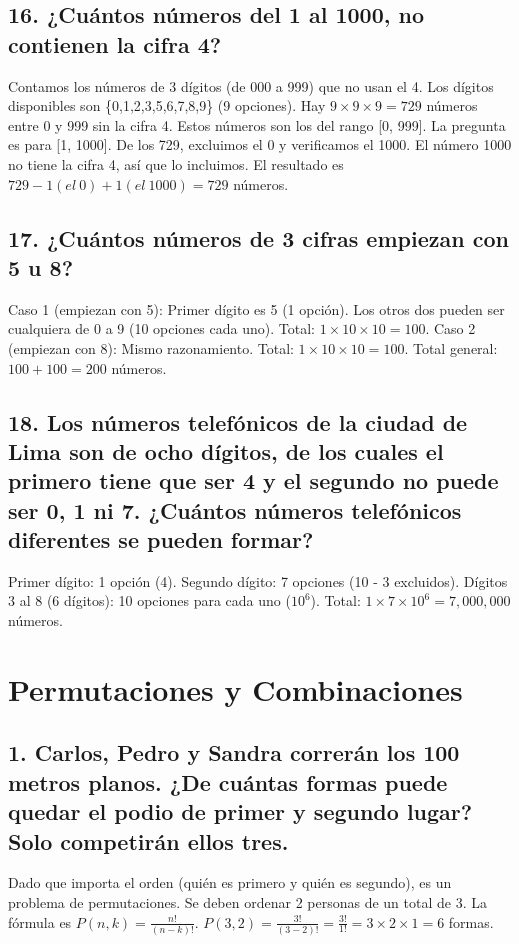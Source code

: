 \documentclass[11pt]{article}
\begin{document}
    \subsection*{16. ¿Cuántos números del 1 al 1000, no contienen la cifra 4?}
    Contamos los números de 3 dígitos (de 000 a 999) que no usan el 4. Los dígitos disponibles son \{0,1,2,3,5,6,7,8,9\} (9 opciones).
    Hay $9 \times 9 \times 9 = 729$ números entre 0 y 999 sin la cifra 4.
    Estos números son los del rango [0, 999]. La pregunta es para [1, 1000]. De los 729, excluimos el 0 y verificamos el 1000. El número 1000 no tiene la cifra 4, así que lo incluimos. El resultado es $729 - 1 (el \: 0) + 1 (el \: 1000) = 729$ números.

    \subsection*{17. ¿Cuántos números de 3 cifras empiezan con 5 u 8?}
    Caso 1 (empiezan con 5): Primer dígito es 5 (1 opción). Los otros dos pueden ser cualquiera de 0 a 9 (10 opciones cada uno). Total: $1 \times 10 \times 10 = 100$.
    Caso 2 (empiezan con 8): Mismo razonamiento. Total: $1 \times 10 \times 10 = 100$.
    Total general: $100 + 100 = 200$ números.

    \subsection*{18. Los números telefónicos de la ciudad de Lima son de ocho dígitos, de los cuales el primero tiene que ser 4 y el segundo no puede ser 0, 1 ni 7. ¿Cuántos números telefónicos diferentes se pueden formar?}
    Primer dígito: 1 opción (4).
    Segundo dígito: 7 opciones (10 - 3 excluidos).
    Dígitos 3 al 8 (6 dígitos): 10 opciones para cada uno ($10^6$).
    Total: $1 \times 7 \times 10^6 = 7,000,000$ números.

\newpage

\section{Permutaciones y Combinaciones}
    \subsection*{1. Carlos, Pedro y Sandra correrán los 100 metros planos. ¿De cuántas formas puede quedar el podio de primer y segundo lugar? Solo competirán ellos tres.}
    Dado que importa el orden (quién es primero y quién es segundo), es un problema de permutaciones. Se deben ordenar 2 personas de un total de 3.
    La fórmula es $P(n,k) = \frac{n!}{(n-k)!}$.
    $P(3,2) = \frac{3!}{(3-2)!} = \frac{3!}{1!} = 3 \times 2 \times 1 = 6$ formas.
\end{document}
